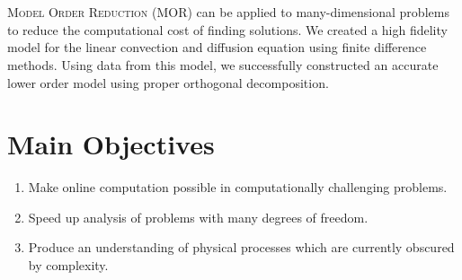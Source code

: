 \documentclass{a0poster}
\makeatletter
\renewenvironment{abstract}{%
    \if@twocolumn
      \section*{\abstractname}%
    \else %
      \begin{center}%
        {\bfseries \LARGE\abstractname\vspace{\z@}}%
      \end{center}%
      \quotation
    \fi}
    {\if@twocolumn\else\endquotation\fi}
\makeatother
\begin{document}
\begin{multicols}{3} %


\color{Navy} %

\hrulefill
\vspace{0.5cm}
\begin{abstract}
\LARGE

\textsc{Model Order Reduction} (MOR) can be applied to many-dimensional problems to reduce the computational cost of finding solutions. We created a high fidelity model for the linear convection and diffusion equation using finite difference methods. Using data from this model, we successfully constructed an accurate lower order model using proper orthogonal decomposition.

\end{abstract}
\hrulefill


\color{Black} %

\section{Main Objectives}
\huge
\begin{enumerate}
\item Make online computation possible in computationally challenging problems.
\item Speed up analysis of problems with many degrees of freedom.
\item Produce an understanding of physical processes which are currently obscured by complexity.
\end{enumerate}


\color{Black} %


\end{multicols}
\end{document}
